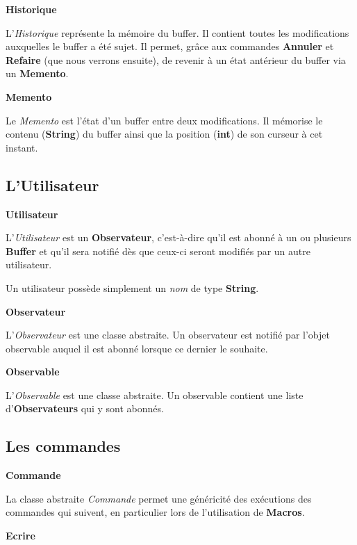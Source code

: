\documentclass[a4paper,11pt]{article}
\begin{document}
\large{\textbf{Historique}}
\medskip

\noindent L'\emph{Historique} représente la mémoire du buffer. Il contient toutes les modifications auxquelles le buffer a été sujet. Il permet, grâce aux commandes \textbf{Annuler} et \textbf{Refaire} (que nous verrons ensuite), de revenir à un état antérieur du buffer via un \textbf{Memento}.
\bigskip

\large{\textbf{Memento}}
\medskip

\noindent Le \emph{Memento} est l'état d'un buffer entre deux modifications. Il mémorise le contenu (\textbf{String}) du buffer ainsi que la position (\textbf{int}) de son curseur à cet instant.
\bigskip

\subsection{L'Utilisateur}\label{subsec:user}
\bigskip

\large{\textbf{Utilisateur}}
\medskip

\noindent L'\emph{Utilisateur} est un \textbf{Observateur}, c'est-à-dire qu'il est abonné à un ou plusieurs \textbf{Buffer} et qu'il sera notifié dès que ceux-ci seront modifiés par un autre utilisateur.
\smallskip

\noindent Un utilisateur possède simplement un \textit{nom} de type \textbf{String}.
\bigskip

\large{\textbf{Observateur}}
\medskip

\noindent L'\emph{Observateur} est une classe abstraite. Un observateur est notifié par l'objet observable auquel il est abonné lorsque ce dernier le souhaite.
\bigskip

\large{\textbf{Observable}}
\medskip

\noindent L'\emph{Observable} est une classe abstraite. Un observable contient une liste d'\textbf{Observateurs} qui y sont abonnés.
\bigskip

\subsection{Les commandes}\label{subsec:commandes}
\bigskip

\large{\textbf{Commande}}
\medskip

\noindent La classe abstraite \emph{Commande} permet une généricité des exécutions des commandes qui suivent, en particulier lors de l'utilisation de \textbf{Macros}.
\bigskip

\large{\textbf{Ecrire}}
\medskip
\end{document}
